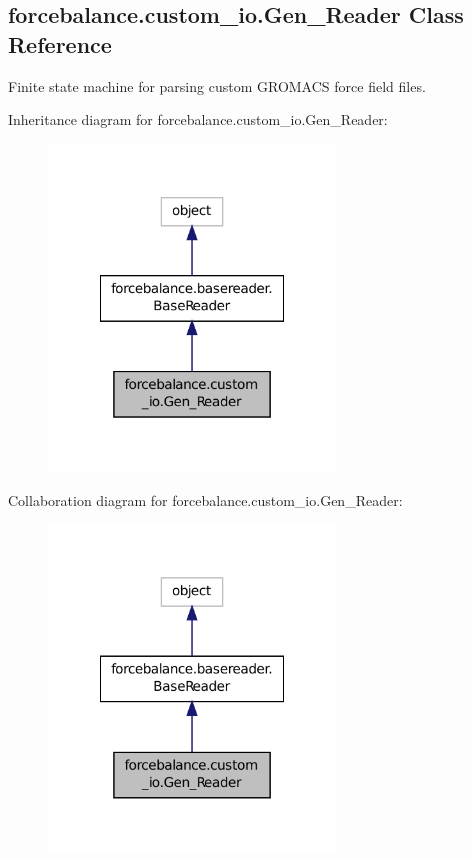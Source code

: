 \hypertarget{classforcebalance_1_1custom__io_1_1Gen__Reader}{\subsection{forcebalance.\-custom\-\_\-io.\-Gen\-\_\-\-Reader Class Reference}
\label{classforcebalance_1_1custom__io_1_1Gen__Reader}
}


Finite state machine for parsing custom G\-R\-O\-M\-A\-C\-S force field files.  




Inheritance diagram for forcebalance.\-custom\-\_\-io.\-Gen\-\_\-\-Reader\-:\nopagebreak
\begin{figure}[H]
\begin{center}
\leavevmode
\includegraphics[width=216pt]{classforcebalance_1_1custom__io_1_1Gen__Reader__inherit__graph}
\end{center}
\end{figure}


Collaboration diagram for forcebalance.\-custom\-\_\-io.\-Gen\-\_\-\-Reader\-:\nopagebreak
\begin{figure}[H]
\begin{center}
\leavevmode
\includegraphics[width=216pt]{classforcebalance_1_1custom__io_1_1Gen__Reader__coll__graph}
\end{center}
\end{figure}
